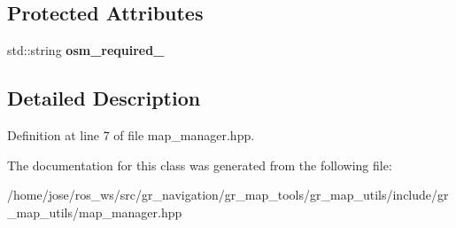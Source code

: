 \subsection*{Protected Attributes}
\begin{DoxyCompactItemize}
\item 
\mbox{\label{classgr__map__utils_1_1MapManager_a7fdb5816e1afba98ba2b4caf6d585136}} 
std\+::string {\bfseries osm\+\_\+required\+\_\+}
\end{DoxyCompactItemize}


\subsection{Detailed Description}


Definition at line 7 of file map\+\_\+manager.\+hpp.



The documentation for this class was generated from the following file\+:\begin{DoxyCompactItemize}
\item 
/home/jose/ros\+\_\+ws/src/gr\+\_\+navigation/gr\+\_\+map\+\_\+tools/gr\+\_\+map\+\_\+utils/include/gr\+\_\+map\+\_\+utils/map\+\_\+manager.\+hpp\end{DoxyCompactItemize}
